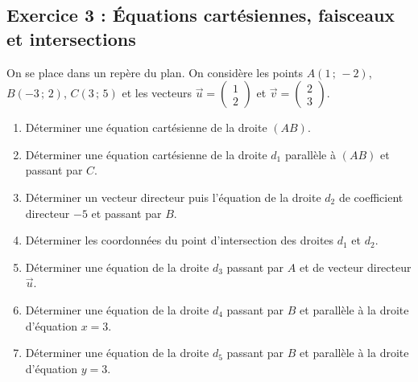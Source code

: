 \documentclass[11pt,a4paper]{article}
\begin{document}
\vspace{0.6cm}
\subsection*{Exercice 3 : Équations cartésiennes, faisceaux et intersections}

\begin{enoncebox}
On se place dans un repère du plan.
On considère les points $A(1\,;\,-2)$, $B(-3\,;\,2)$, $C(3\,;\,5)$ et les vecteurs $\vec{u} = \begin{pmatrix} 1 \\ 2 \end{pmatrix}$ et $\vec{v} = \begin{pmatrix} 2 \\ 3 \end{pmatrix}$.
\begin{enumerate}
    \item Déterminer une équation cartésienne de la droite $(AB)$.
    \item Déterminer une équation cartésienne de la droite $d_1$ parallèle à $(AB)$ et passant par $C$.
    \item Déterminer un vecteur directeur puis l'équation de la droite $d_2$ de coefficient directeur $-5$ et passant par $B$.
    \item Déterminer les coordonnées du point d'intersection des droites $d_1$ et $d_2$.
    \item Déterminer une équation de la droite $d_3$ passant par $A$ et de vecteur directeur $\vec{u}$.
    \item Déterminer une équation de la droite $d_4$ passant par $B$ et parallèle à la droite d'équation $x = 3$.
    \item Déterminer une équation de la droite $d_5$ passant par $B$ et parallèle à la droite d'équation $y = 3$.
\end{enumerate}
\end{enoncebox}
\end{document}
